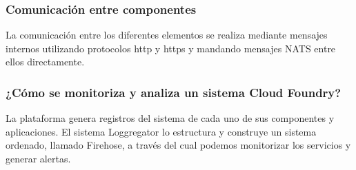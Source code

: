 \documentclass[a4paper,11pt]{article}
\begin{document}
\subsubsection{Comunicación entre componentes}
La comunicación entre los diferentes elementos se realiza mediante mensajes internos utilizando protocolos http y https y mandando mensajes NATS entre ellos directamente.

\subsubsection{¿Cómo se monitoriza y analiza un sistema Cloud Foundry?}
La plataforma genera registros del sistema de cada uno de sus componentes y aplicaciones. El sistema Loggregator lo estructura y construye un sistema ordenado, llamado Firehose, a través del cual podemos monitorizar los servicios y generar alertas.
\end{document}
